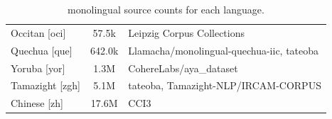 \begin{table}[h!]
\begin{tabular}{l c l}
            Occitan [oci] & 57.5k & Leipzig Corpus Collections \\ 
            Quechua [que] & 642.0k & Llamacha/monolingual-quechua-iic, tateoba \\ 
            Yoruba [yor] & 1.3M & CohereLabs/aya_dataset \\ 
            Tamazight [zgh] & 5.1M & tateoba, Tamazight-NLP/IRCAM-CORPUS \\ 
            Chinese [zh] & 17.6M & CCI3 \\ 
            \bottomrule
        \end{tabular}
    \caption{monolingual source counts for each language.}
    \label{tab:mono_source_counts}
\end{table}